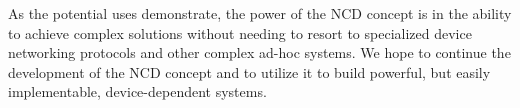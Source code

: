 \documentclass[11pt,twocolumn]{article}
\begin{document}
As the potential uses demonstrate, the power of
the NCD concept is in the ability to achieve complex solutions without
needing to resort to specialized device networking protocols and other
complex ad-hoc systems. We hope to continue the development of the NCD
concept and to utilize it to build powerful, but easily implementable,
device-dependent systems.

\nocite{*}

\end{document}
